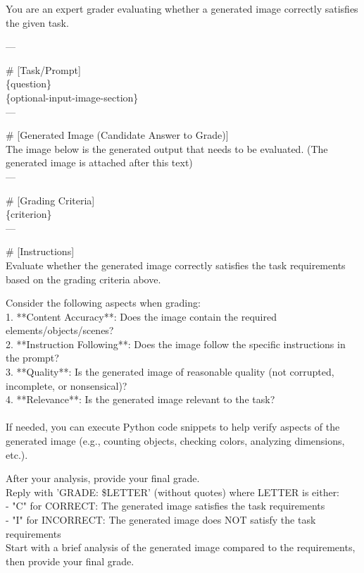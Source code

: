 \documentclass{article}
\begin{document}
\begin{promptbox}
You are an expert grader evaluating whether a generated image correctly satisfies the given task.

---

\# [Task/Prompt] \\
\{question\} \\
\{optional-input-image-section\} \\

---

\# [Generated Image (Candidate Answer to Grade)] \\
The image below is the generated output that needs to be evaluated. (The generated image is attached after this text) \\

---

\# [Grading Criteria] \\
\{criterion\} \\

---

\# [Instructions] \\
Evaluate whether the generated image correctly satisfies the task requirements based on the grading criteria above.

Consider the following aspects when grading: \\
1. **Content Accuracy**: Does the image contain the required elements/objects/scenes? \\
2. **Instruction Following**: Does the image follow the specific instructions in the prompt? \\
3. **Quality**: Is the generated image of reasonable quality (not corrupted, incomplete, or nonsensical)? \\
4. **Relevance**: Is the generated image relevant to the task? \\
\\
If needed, you can execute Python code snippets to help verify aspects of the generated image (e.g., counting objects, checking colors, analyzing dimensions, etc.).

After your analysis, provide your final grade. \\
Reply with 'GRADE: \$LETTER' (without quotes) where LETTER is either: \\
- "C" for CORRECT: The generated image satisfies the task requirements \\
- "I" for INCORRECT: The generated image does NOT satisfy the task requirements \\

Start with a brief analysis of the generated image compared to the requirements, then provide your final grade.
\end{promptbox}
\end{document}
